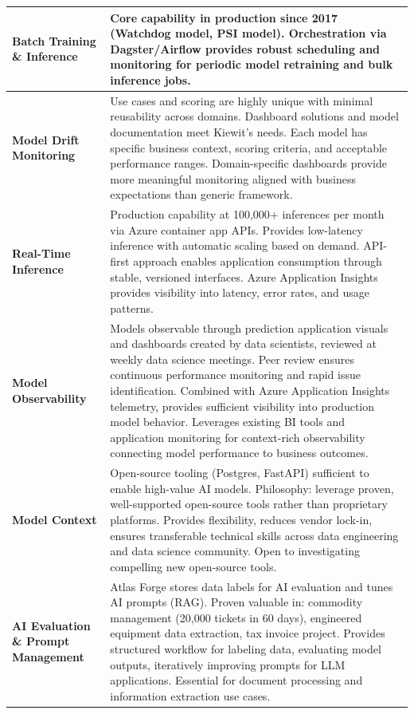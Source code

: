\documentclass[12pt, a4paper]{article}
\begin{document}
{\begin{tabularx}{\textwidth}{@{}
  >{\raggedright\arraybackslash}p{2.8cm}
  >{\raggedright\arraybackslash}X@{}}
\textbf{Batch Training \& Inference} &
Core capability in production since 2017 (Watchdog model, PSI model). Orchestration via Dagster/Airflow provides robust scheduling and monitoring for periodic model retraining and bulk inference jobs. \\
\midrule

\textbf{Model Drift Monitoring} &
Use cases and scoring are highly unique with minimal reusability across domains. Dashboard solutions and model documentation meet Kiewit's needs. Each model has specific business context, scoring criteria, and acceptable performance ranges. Domain-specific dashboards provide more meaningful monitoring aligned with business expectations than generic framework. \\
\midrule

\textbf{Real-Time Inference} &
Production capability at 100,000+ inferences per month via Azure container app APIs. Provides low-latency inference with automatic scaling based on demand. API-first approach enables application consumption through stable, versioned interfaces. Azure Application Insights provides visibility into latency, error rates, and usage patterns. \\
\midrule

\textbf{Model Observability} &
Models observable through prediction application visuals and dashboards created by data scientists, reviewed at weekly data science meetings. Peer review ensures continuous performance monitoring and rapid issue identification. Combined with Azure Application Insights telemetry, provides sufficient visibility into production model behavior. Leverages existing BI tools and application monitoring for context-rich observability connecting model performance to business outcomes. \\
\midrule

\textbf{Model Context} &
Open-source tooling (Postgres, FastAPI) sufficient to enable high-value AI models. Philosophy: leverage proven, well-supported open-source tools rather than proprietary platforms. Provides flexibility, reduces vendor lock-in, ensures transferable technical skills across data engineering and data science community. Open to investigating compelling new open-source tools. \\
\midrule

\textbf{AI Evaluation \& Prompt Management} &
Atlas Forge stores data labels for AI evaluation and tunes AI prompts (RAG). Proven valuable in: commodity management (20,000 tickets in 60 days), engineered equipment data extraction, tax invoice project. Provides structured workflow for labeling data, evaluating model outputs, iteratively improving prompts for LLM applications. Essential for document processing and information extraction use cases. \\
\bottomrule
\end{tabularx}
}
\end{document}

